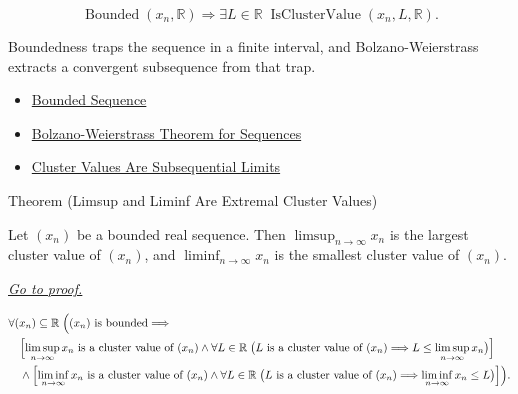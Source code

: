 \begin{remark*}
\[
\operatorname{Bounded}(x_n,\mathbb{R})
\Longrightarrow
\exists L\in\mathbb{R}\;\operatorname{IsClusterValue}(x_n,L,\mathbb{R}).
\]
\end{remark*}

\begin{remark*}[Interpretation]
Boundedness traps the sequence in a finite interval, and
Bolzano-Weierstrass extracts a convergent subsequence from that trap.
\end{remark*}

\begin{dependencies}
\begin{itemize}
  \item \hyperref[def:bounded-sequence]{Bounded Sequence}
  \item \hyperref[thm:bolzano-weierstrass-sequences]{Bolzano-Weierstrass Theorem for Sequences}
  \item \hyperref[thm:cluster-values-are-subsequential-limits]{Cluster Values Are Subsequential Limits}
\end{itemize}
\end{dependencies}


\begin{theorembox}{Theorem (Limsup and Liminf Are Extremal Cluster Values)}
\begin{theorem}
\label{thm:limsup-liminf-extremal-cluster-values}
Let $(x_n)$ be a bounded real sequence. Then
$\limsup_{n\to\infty}x_n$ is the largest cluster value of $(x_n)$, and
$\liminf_{n\to\infty}x_n$ is the smallest cluster value of $(x_n)$.

\smallskip
\noindent
\hyperref[prf:limsup-liminf-extremal-cluster-values]{\textit{Go to proof.}}
\end{theorem}
\end{theorembox}

\begin{remark*}
\[
\begin{aligned}
&\forall (x_n)\subseteq\mathbb{R}\;
\Bigl(
  (x_n)\text{ is bounded}
  \Longrightarrow\\
&\quad
  \Bigl[
    \limsup_{n\to\infty}x_n
    \text{ is a cluster value of }(x_n)
    \land
    \forall L\in\mathbb{R}\;
    \bigl(L\text{ is a cluster value of }(x_n)
    \Longrightarrow L\le \limsup_{n\to\infty}x_n\bigr)
  \Bigr]\\
&\quad\land
  \Bigl[
    \liminf_{n\to\infty}x_n
    \text{ is a cluster value of }(x_n)
    \land
    \forall L\in\mathbb{R}\;
    \bigl(L\text{ is a cluster value of }(x_n)
    \Longrightarrow \liminf_{n\to\infty}x_n\le L\bigr)
  \Bigr]
\Bigr).
\end{aligned}
\]
\end{remark*}

